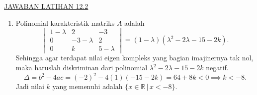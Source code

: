 \documentclass[a4paper]{article}
\theoremstyle{definisi}
\numberwithin{equation}{section}
\newcommand{\R}{\mathbb{R}}
\begin{document}
  \newpage
  \underline{JAWABAN LATIHAN 12.2}
  \begin{enumerate}
    \item Polinomial karakteristik matriks $A$ adalah 
    \begin{equation*}
      \begin{vmatrix}
        1-\lambda & 2 & -3\\
        0 & -3-\lambda & 2\\
        0 & k & 5-\lambda
      \end{vmatrix} = (1-\lambda)(\lambda^2-2\lambda-15-2k). 
    \end{equation*}
    Sehingga agar terdapat nilai eigen kompleks yang bagian imajinernya tak nol, maka haruslah diskriminan dari polinomial $\lambda^2-2\lambda-15-2k$ negatif. 
    \[\Delta = b^2-4ac = (-2)^2-4(1)(-15-2k)=64+8k < 0 \implies k < -8.\]
    Jadi nilai $k$ yang memenuhi adalah $\{x\in\R\,|\,x<-8\}$.


\end{enumerate}
\end{document}
